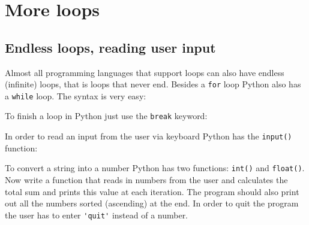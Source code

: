 \section{More loops}

\subsection{Endless loops, reading user input}
Almost all programming languages that support loops can also have endless (infinite) loops, that is loops that never end.
Besides a \verb|for| loop Python also has a \verb|while| loop. The syntax is very easy: \\


\begin{tcolorbox}[enhanced jigsaw,breakable,pad at break*=1mm,
    colback=blue!5!white,colframe=babyblueeyes,title=While loop 1,
    watermark color=white]
    
\end{tcolorbox}

To finish a loop in Python just use the \verb|break| keyword: \\

\begin{tcolorbox}[enhanced jigsaw,breakable,pad at break*=1mm,
    colback=blue!5!white,colframe=babyblueeyes,title=While loop 2,
    watermark color=white]
    
\end{tcolorbox}

In order to read an input from the user via keyboard Python has the \verb|input()| function: \\

\begin{tcolorbox}[enhanced jigsaw,breakable,pad at break*=1mm,
    colback=blue!5!white,colframe=babyblueeyes,title=User input 1,
    watermark color=white]
    
\end{tcolorbox}

To convert a string into a number Python has two functions: \verb|int()| and \verb|float()|. \\

Now write a function that reads in numbers from the user and calculates the total sum and prints this value at each iteration.
The program should also print out all the numbers sorted (ascending) at the end. In order to quit the program the user has to enter \verb|'quit'| instead of a number. \\

